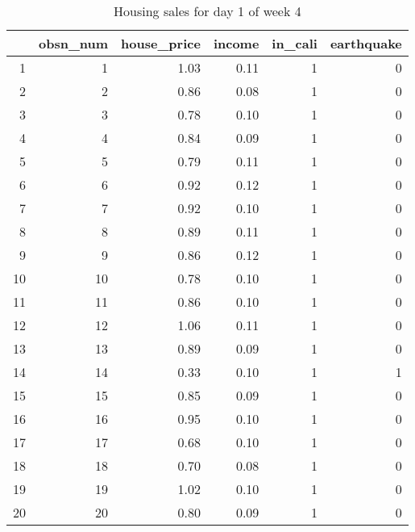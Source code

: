 \begin{table}[ht]
\centering
\begin{tabular}{rrrrrr}
  \hline
 & obsn\_num & house\_price & income & in\_cali & earthquake \\ 
  \hline
1 &   1 & 1.03 & 0.11 &   1 &   0 \\ 
  2 &   2 & 0.86 & 0.08 &   1 &   0 \\ 
  3 &   3 & 0.78 & 0.10 &   1 &   0 \\ 
  4 &   4 & 0.84 & 0.09 &   1 &   0 \\ 
  5 &   5 & 0.79 & 0.11 &   1 &   0 \\ 
  6 &   6 & 0.92 & 0.12 &   1 &   0 \\ 
  7 &   7 & 0.92 & 0.10 &   1 &   0 \\ 
  8 &   8 & 0.89 & 0.11 &   1 &   0 \\ 
  9 &   9 & 0.86 & 0.12 &   1 &   0 \\ 
  10 &  10 & 0.78 & 0.10 &   1 &   0 \\ 
  11 &  11 & 0.86 & 0.10 &   1 &   0 \\ 
  12 &  12 & 1.06 & 0.11 &   1 &   0 \\ 
  13 &  13 & 0.89 & 0.09 &   1 &   0 \\ 
  14 &  14 & 0.33 & 0.10 &   1 &   1 \\ 
  15 &  15 & 0.85 & 0.09 &   1 &   0 \\ 
  16 &  16 & 0.95 & 0.10 &   1 &   0 \\ 
  17 &  17 & 0.68 & 0.10 &   1 &   0 \\ 
  18 &  18 & 0.70 & 0.08 &   1 &   0 \\ 
  19 &  19 & 1.02 & 0.10 &   1 &   0 \\ 
  20 &  20 & 0.80 & 0.09 &   1 &   0 \\ 
   \hline
\end{tabular}
\caption{Housing sales for day 1 of week 4} 
\end{table}
